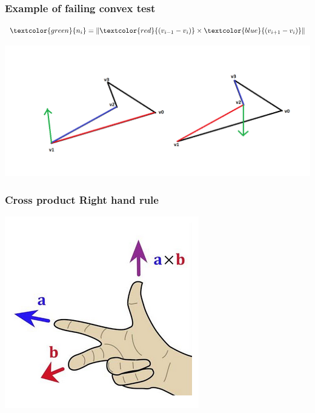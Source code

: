 \documentclass{beamer}
\begin{document}
\begin{frame}
    \frametitle{Example of failing convex test}

    $$
    \textcolor{green}{n_i} = \|\textcolor{red}{(v_{i-1} - v_{i})} \times \textcolor{blue}{(v_{i+1} - v_{i})}\|
    $$

    \begin{center}
        \includegraphics[scale=0.3]{opp-dir.png}
    \end{center}

\end{frame}

\begin{frame}
    \frametitle{Cross product \textbf{Right hand} rule}

    \begin{center}
        \includegraphics[scale=0.6]{cross-prod.png}
    \end{center}

\end{frame}
\end{document}
